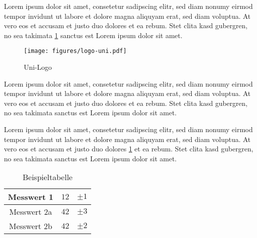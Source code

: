 \documentclass[12pt]{scrartcl}
\begin{document}
\setcounter{exnum}{20}
Lorem ipsum dolor sit amet, consetetur sadipscing elitr, sed diam nonumy eirmod tempor invidunt ut labore et dolore magna aliquyam erat, sed diam voluptua. At vero eos et accusam et justo duo dolores et ea rebum. Stet clita kasd gubergren, no sea takimata \ref{fig:logo-uni} sanctus est Lorem ipsum dolor sit amet.

\begin{figure}[!h]
	\centering
		\texttt{[image: figures/logo-uni.pdf]}
	\caption{Uni-Logo}
	\label{fig:logo-uni}
\end{figure}
Lorem ipsum dolor sit amet, consetetur sadipscing elitr, sed diam nonumy eirmod tempor invidunt ut labore et dolore magna aliquyam erat, sed diam voluptua. At vero eos et accusam et justo duo dolores et ea rebum. Stet clita kasd gubergren, no sea takimata sanctus est Lorem ipsum dolor sit amet.

Lorem ipsum dolor sit amet, consetetur sadipscing elitr, sed diam nonumy eirmod tempor invidunt ut labore et dolore magna aliquyam erat, sed diam voluptua. At vero eos et accusam et justo duo dolores \ref{tab:tabelle} et ea rebum. Stet clita kasd gubergren, no sea takimata sanctus est Lorem ipsum dolor sit amet.
\begin{table}[!h]	
	\centering
  \begin{tabular}{c|r l}	 
    Messwert 1 & $12$ & $\pm 1$ \\   \hline	 
    Messwert 2a & $42$ & $\pm 3$ \\	 
    Messwert 2b & $42$ & $\pm 2$ 	
  \end{tabular}	
  \caption{Beispieltabelle}	
  \label{tab:tabelle}
\end{table}


\end{document}
